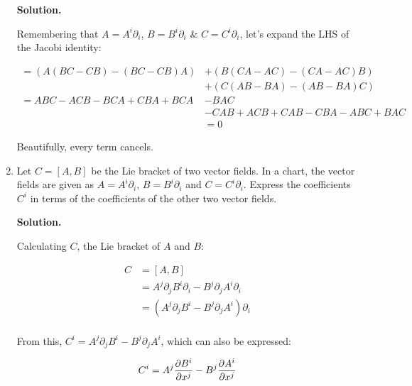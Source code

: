 \documentclass[10pt]{article}
\begin{document}
\begin{enumerate}[start=1,label={\bfseries Exercise \arabic*:},leftmargin=1in]
        \textbf{Solution.}

        Remembering that \(A = A^i \partial_i\), \(B = B^i \partial_i\) \& \(C = C^i \partial_i\), let's expand the LHS of the Jacobi identity:

        \begin{align*}
            = ( A (BC-CB) - (BC-CB)A) &+ ( B (CA-AC) - (CA-AC)B) \\ 
            &+ ( C (AB-BA) - (AB-BA )C ) \\
            = ABC - ACB - BCA + CBA + BCA &- BAC \\ 
            &- CAB + ACB + CAB - CBA - ABC + BAC \\
            &= 0 
        \end{align*}

        Beautifully, every term cancels.


    \bigskip
    \item Let \(C = [A, B]\) be the Lie bracket of two vector fields. In a chart, the vector fields are given as \(A = A^i \partial_i\), \(B = B^i \partial_i\) and \(C = C^i \partial_i\). Express the coefficients \(C^i\) in terms of the coefficients of the other two vector fields.

        \textbf{Solution.}

        Calculating \(C\), the Lie bracket of \(A\) and \(B\):

        \begin{align*}
            C &= [A, B] \\
              &= A^j \partial_j B^i \partial_i - B^j \partial_j A^i \partial_i \\
              &= ( A^j \partial_j B^i - B^j \partial_j A^i ) \partial_i \\
        \end{align*}

        From this, \(C^i = A^j \partial_j B^i - B^j \partial_j A^i \), which can also be expressed:

        \begin{equation*}
            C^i = A^j \pdv{B^i}{x^j} - B^j \pdv{A^i}{x^j}
        \end{equation*}


\end{enumerate}
\end{document}
